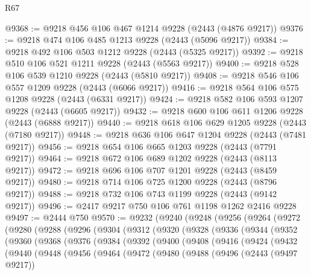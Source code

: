 \begin{lexlean}{R67}
\begin{coremodule}
@9368 := @9218 @456 @106 @467 @1214 @9228 (@2443 (@4876 @9217))
@9376 := @9218 @474 @106 @485 @1213 @9228 (@2443 (@5096 @9217))
@9384 := @9218 @492 @106 @503 @1212 @9228 (@2443 (@5325 @9217))
@9392 := @9218 @510 @106 @521 @1211 @9228 (@2443 (@5563 @9217))
@9400 := @9218 @528 @106 @539 @1210 @9228 (@2443 (@5810 @9217))
@9408 := @9218 @546 @106 @557 @1209 @9228 (@2443 (@6066 @9217))
@9416 := @9218 @564 @106 @575 @1208 @9228 (@2443 (@6331 @9217))
@9424 := @9218 @582 @106 @593 @1207 @9228 (@2443 (@6605 @9217))
@9432 := @9218 @600 @106 @611 @1206 @9228 (@2443 (@6888 @9217))
@9440 := @9218 @618 @106 @629 @1205 @9228 (@2443 (@7180 @9217))
@9448 := @9218 @636 @106 @647 @1204 @9228 (@2443 (@7481 @9217))
@9456 := @9218 @654 @106 @665 @1203 @9228 (@2443 (@7791 @9217))
@9464 := @9218 @672 @106 @689 @1202 @9228 (@2443 (@8113 @9217))
@9472 := @9218 @696 @106 @707 @1201 @9228 (@2443 (@8459 @9217))
@9480 := @9218 @714 @106 @725 @1200 @9228 (@2443 (@8796 @9217))
@9488 := @9218 @732 @106 @743 @1199 @9228 (@2443 (@9142 @9217))
@9496 := @2417 @9217 @750 @106 @761 @1198 @1262 @2416 @9228
@9497 := @2444 @750
@9570 := @9232
    (@9240
      (@9248
        (@9256
          (@9264
            (@9272
              (@9280
                (@9288
                  (@9296
                    (@9304
                      (@9312
                        (@9320
                          (@9328
                            (@9336
                              (@9344
                                (@9352
                                  (@9360
                                    (@9368
                                      (@9376
                                        (@9384
                                          (@9392
                                            (@9400
                                              (@9408
                                                (@9416
                                                  (@9424
                                                    (@9432
                                                      (@9440
                                                        (@9448
                                                          (@9456
                                                            (@9464
                                                              (@9472
                                                                (@9480
                                                                  (@9488
                                                                    (@9496
                                                                      (@2443 (@9497 @9217))

\end{coremodule}
\end{lexlean}
